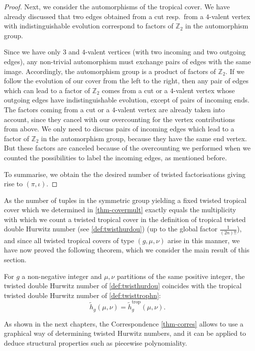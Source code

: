 \documentclass[ALCO,published]{cedram}
\DeclareMathOperator{\trop}{trop}
\begin{document}
\begin{proof}
Next, we consider the automorphisms of the tropical cover. We have already discussed that two edges obtained from a cut resp.\ from a $4$-valent vertex with indistinguishable evolution correspond to factors of $\mathbb{Z}_2$ in the  automorphism  group. 

Since we have only $3$ and $4$-valent vertices (with two incoming and two outgoing edges), any non-trivial automorphism  must exchange pairs of edges with the same image. Accordingly, the automorphism group is a product of factors of $\mathbb{Z}_2$. If we follow the evolution of our cover from the left to the right, then any pair of edges which can lead to a factor of $\mathbb{Z}_2$ comes from a cut or a $4$-valent vertex whose outgoing edges have indistinguishable evolution, except of pairs of incoming ends. The  factors coming from a cut or a $4$-valent vertex are already taken into account, since they cancel with our overcounting for the vertex contributions from above. We only need to discuss pairs of incoming edges which lead to a factor of $\mathbb{Z}_2$ in the automorphism group, because they have the same end vertex.
But these factors are canceled because of the overcounting we performed when we counted the possibilities to label the incoming edges, as mentioned before.

To summarise, we obtain the the desired number of twisted factorisations giving rise to $(\pi,\iota)$.
\end{proof}

As the number of tuples in the symmetric group yielding a fixed twisted tropical cover which we determined in \cref{thm-covermult} exactly equals the multiplicity with which we count a twisted tropical cover in the definition of tropical twisted double Hurwitz number (see \cref{def:twisthurdou}) (up to the global factor $\frac{1}{(2n)!!}$), and since all twisted tropical covers of type $(g,\mu,\nu)$ arise in this manner, we have now proved the following theorem, which we consider the main result of this section.

\begin{theo}
\label{thm-corres}
For $g$ a non-negative integer and $\mu,\nu$ partitions of the same positive integer, the twisted double Hurwitz number of \cref{def:twisthurdou} coincides with the tropical twisted double Hurwitz number of \cref{def:twisttrophn}:
$$\tilde{h}_g(\mu,\nu)=\tilde{h}^{\trop}_g(\mu,\nu).$$
\end{theo}

As shown in the next chapters, the Correspondence \cref{thm-corres} allows to use a graphical way of determining twisted Hurwitz numbers, and it can be applied to deduce structural properties such as piecewise polynomiality.
\end{document}
